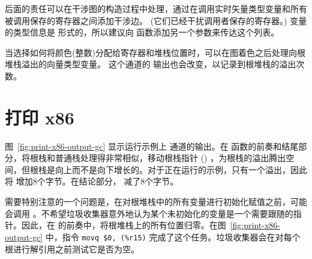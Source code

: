 \documentclass[11pt]{book}
\begin{document}
后面的责任可以在干涉图的构造过程中处理，通过在调用实时矢量类型变量和所有被调用保存的寄存器之间添加干涉边。 (它们已经干扰调用者保存的寄存器。)  变量的类型信息是  形式的，所以建议向 
函数添加另一个参数来传达这个列表。

当选择如何将颜色(整数)分配给寄存器和堆栈位置时，可以在图着色之后处理向根堆栈溢出的向量类型变量。 这个通道的  输出也会改变，以记录到根堆栈的溢出次数。

%





\section{打印 x86}
\label{sec:print-x86-gc}

图~\ref{fig:print-x86-output-gc} 显示运行示例上
 通道的输出。在  函数的前奏和结尾部分，将根栈和普通栈处理得非常相似，移动根栈指针
() ，为根栈的溢出腾出空间，但根栈是向上而不是向下增长的。对于正在运行的示例，只有一个溢出，因此将  增加8个字节。在结论部分，  减了8个字节。

需要特别注意的一个问题是，在对根堆栈中的所有变量进行初始化赋值之前，可能会调用
 。不希望垃圾收集器意外地认为某个未初始化的变量是一个需要跟随的指针。因此，在  的前奏中，将根堆栈上的所有位置归零。在图~\ref{fig:print-x86-output-gc} 中，指令
%
\lstinline{movq $0, (%r15)}
%
完成了这个任务。垃圾收集器会在对每个根进行解引用之前测试它是否为空。
\end{document}

